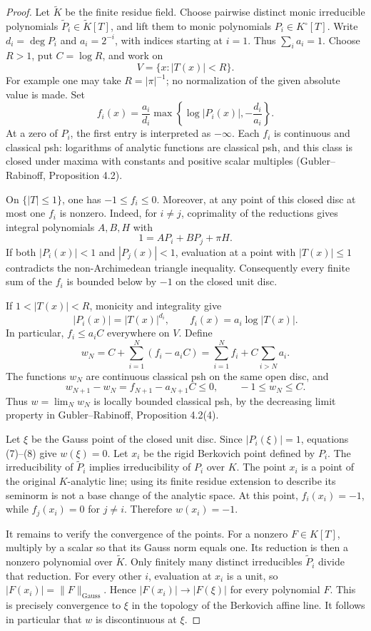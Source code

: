 \documentclass[11pt,a4paper]{article}
\numberwithin{equation}{section}
\theoremstyle{definition}
\theoremstyle{remark}
\begin{document}
\begin{proof}
Let \(\widetilde K\) be the finite residue field. Choose pairwise distinct
monic irreducible polynomials
\(\widetilde P_i\in\widetilde K[T]\), and lift them to monic polynomials
\(P_i\in K^\circ[T]\). Write \(d_i=\deg P_i\) and \(a_i=2^{-i}\), with
indices starting at \(i=1\). Thus \(\sum_i a_i=1\). Choose \(R>1\), put
\(C=\log R\), and work on
\[
 V=\{x:|T(x)|<R\}.
\]
For example one may take \(R=|\pi|^{-1}\); no normalization of the given
absolute value is made. Set
\[
 f_i(x)=\frac{a_i}{d_i}
       \max\!\left\{\log|P_i(x)|,-\frac{d_i}{a_i}\right\}.
\tag{7}
\]
At a zero of \(P_i\), the first entry is interpreted as \(-\infty\).
Each \(f_i\) is continuous and classical psh: logarithms of analytic
functions are classical psh, and this class is closed under maxima with
constants and positive scalar multiples (Gubler--Rabinoff,
Proposition 4.2).

On \(\{|T|\leq1\}\), one has \(-1\leq f_i\leq0\). Moreover, at any
point of this closed disc at most one \(f_i\) is nonzero. Indeed, for
\(i\ne j\), coprimality of the reductions gives integral polynomials
\(A,B,H\) with
\[
 1=A P_i+B P_j+\pi H.
\]
If both \(|P_i(x)|<1\) and \(|P_j(x)|<1\), evaluation at a point with
\(|T(x)|\leq1\) contradicts the non-Archimedean triangle inequality.
Consequently every finite sum of the \(f_i\) is bounded below by \(-1\)
on the closed unit disc.

If \(1<|T(x)|<R\), monicity and integrality give
\[
 |P_i(x)|=|T(x)|^{d_i},\qquad f_i(x)=a_i\log|T(x)|.
\]
In particular, \(f_i\leq a_i C\) everywhere on \(V\). Define
\[
 w_N=C+\sum_{i=1}^N(f_i-a_i C)
     =\sum_{i=1}^N f_i+C\sum_{i>N}a_i.
\tag{8}
\]
The functions \(w_N\) are continuous classical psh on the same open disc,
and
\[
 w_{N+1}-w_N=f_{N+1}-a_{N+1}C\leq0,
 \qquad -1\leq w_N\leq C.
\]
Thus \(w=\lim_N w_N\) is locally bounded classical psh, by the decreasing
limit property in Gubler--Rabinoff, Proposition 4.2(4).

Let \(\xi\) be the Gauss point of the closed unit disc. Since
\(|P_i(\xi)|=1\), equations (7)--(8) give \(w(\xi)=0\). Let \(x_i\)
be the rigid Berkovich point defined by \(P_i\). The irreducibility of
\(\widetilde P_i\) implies irreducibility of \(P_i\) over \(K\).
The point \(x_i\) is a point of the original \(K\)-analytic line; using
its finite residue extension to describe its seminorm is not a base
change of the analytic space. At this point, \(f_i(x_i)=-1\), while
\(f_j(x_i)=0\) for \(j\ne i\). Therefore \(w(x_i)=-1\).

It remains to verify the convergence of the points. For a nonzero
\(F\in K[T]\), multiply by a scalar so that its Gauss norm equals one.
Its reduction is then a nonzero polynomial over \(\widetilde K\).
Only finitely many distinct irreducibles \(\widetilde P_i\) divide that
reduction. For every other \(i\), evaluation at \(x_i\) is a unit,
so \(|F(x_i)|=\|F\|_{\mathrm{Gauss}}\). Hence
\(|F(x_i)|\to|F(\xi)|\) for every polynomial \(F\). This is precisely
convergence to \(\xi\) in the topology of the Berkovich affine line.
It follows in particular that \(w\) is discontinuous at \(\xi\).
\end{proof}
\end{document}
